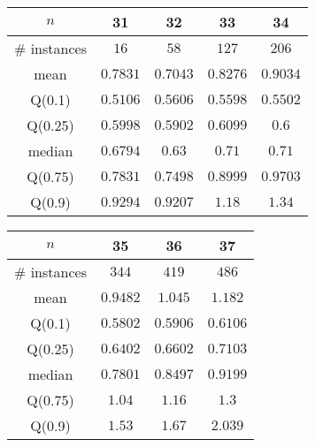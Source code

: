 \begin{tabular}{c|cccc} 
\hline 
$n$ & 31 & 32 & 33 & 34 \tabularnewline 
\hline 
\hline 
\# instances & $16$ & $58$ & $127$ & $206$ \tabularnewline 
mean & $0.7831$ & $0.7043$ & $0.8276$ & $0.9034$ \tabularnewline 
Q(0.1) & $0.5106$ & $0.5606$ & $0.5598$ & $0.5502$ \tabularnewline 
Q(0.25) & $0.5998$ & $0.5902$ & $0.6099$ & $0.6$ \tabularnewline 
median & $0.6794$ & $0.63$ & $0.71$ & $0.71$ \tabularnewline 
Q(0.75) & $0.7831$ & $0.7498$ & $0.8999$ & $0.9703$ \tabularnewline 
Q(0.9) & $0.9294$ & $0.9207$ & $1.18$ & $1.34$ \tabularnewline 
\hline 
\end{tabular} 
\medskip{} 

\begin{tabular}{c|ccc} 
\hline 
$n$ & 35 & 36 & 37 \tabularnewline 
\hline 
\hline 
\# instances & $344$ & $419$ & $486$ \tabularnewline 
mean & $0.9482$ & $1.045$ & $1.182$ \tabularnewline 
Q(0.1) & $0.5802$ & $0.5906$ & $0.6106$ \tabularnewline 
Q(0.25) & $0.6402$ & $0.6602$ & $0.7103$ \tabularnewline 
median & $0.7801$ & $0.8497$ & $0.9199$ \tabularnewline 
Q(0.75) & $1.04$ & $1.16$ & $1.3$ \tabularnewline 
Q(0.9) & $1.53$ & $1.67$ & $2.039$ \tabularnewline 
\hline 
\end{tabular} 
\medskip{} 

